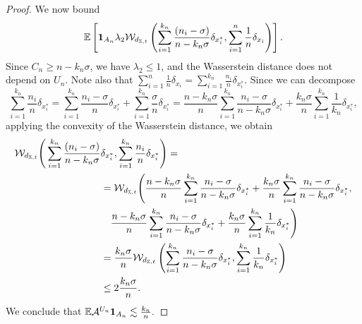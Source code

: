 \begin{proof}
    We now bound
    \[
    \mathbb{E} \left[\mathbf{1}_{A_n}\lambda_2\mathcal{W}_{d_{\mathbb{X},t}} \left( \sum_{i = 1}^{k_n} \frac{(n_i-\sigma)}{n-k_n\sigma}\delta_{x_i^*},\sum_{i = 1}^n\frac{1}{n}\delta_{x_i}\right)\right].
    \]
    Since $C_n \geq n - k_n\sigma$, we have $\lambda_2 \leq 1$, and the Wasserstein distance does not depend on $U_n$. Note also that $\sum_{i = 1}^n \frac{1}{n}\delta_{x_i} = \sum_{i = 1}^{k_n}\frac{n_i}{n}\delta_{x_i^*}$. Since we can decompose
    \[
    \sum_{i = 1}^{k_n}\frac{n_i}{n}\delta_{x_i^*} = \sum_{i = 1}^{k_n} \frac{n_i-\sigma}{n}\delta_{x_i^*} + \sum_{i = 1}^{k_n} \frac{\sigma}{n}\delta_{x_i^*} = 
    \frac{n-k_n\sigma}{n}\sum_{i = 1}^{k_n} \frac{n_i - \sigma}{n - k_n\sigma}\delta_{x_i^*} + \frac{k_n \sigma}{n}\sum_{i = 1}^{k_n}\frac{1}{k_n} \delta_{x_i^*},
    \]
    applying the convexity of the Wasserstein distance, we obtain
    \begin{align*}
        \mathcal{W}_{d_{\mathbb{X},t}}\Bigg( \sum_{i = 1}^{k_n} \frac{(n_i-\sigma)}{n-k_n\sigma}&\delta_{x_i^*},\sum_{i = 1}^{k_n}\frac{n_i}{n}\delta_{x_i^*}\Bigg) = \\
        & = \mathcal{W}_{d_{\mathbb{X},t}} \Bigg( \frac{n-k_n\sigma}{n}\sum_{i = 1}^{k_n} \frac{n_i - \sigma}{n - k_n\sigma}\delta_{x_i^*} + \frac{k_n \sigma}{n}\sum_{i = 1}^{k_n}\frac{n_i - \sigma}{n - k_n\sigma} \delta_{x_i^*}, \\ 
        & \quad  \frac{n-k_n\sigma}{n}\sum_{i = 1}^{k_n} \frac{n_i - \sigma}{n - k_n\sigma}\delta_{x_i^*} + \frac{k_n \sigma}{n}\sum_{i = 1}^{k_n}\frac{1}{k_n} \delta_{x_i^*}\Bigg) \\
        & = \frac{k_n \sigma}{n} \mathcal{W}_{d_{\mathbb{X},t}}\left( \sum_{i = 1}^{k_n} \frac{n_i - \sigma}{n - k_n\sigma}\delta_{x_i^*}, \sum_{i = 1}^{k_n}\frac{1}{k_n}\delta_{x_i^*}\right) \\
        & \leq 2 \frac{k_n\sigma}{n}.
    \end{align*}
    We conclude that $\mathbb{E} \mathcal{A}^{U_n} \mathbf{1}_{A_n} \lesssim \frac{k_n}{n}.$


\end{proof}
